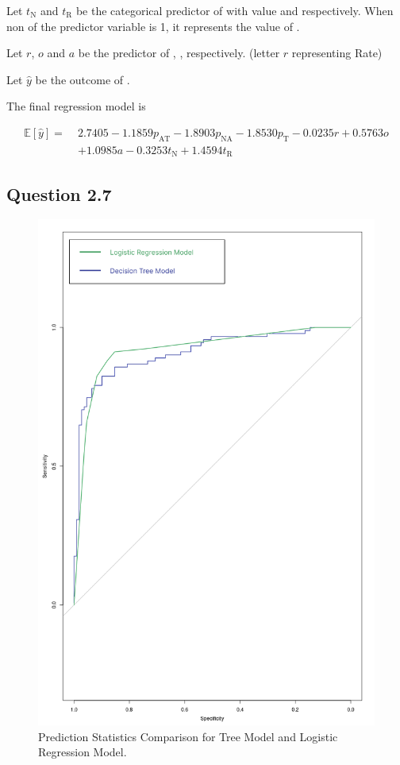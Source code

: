 \documentclass[parskip=full]{scrartcl}
\begin{document}
    Let $t_{\text{N}}$ and $t_{\text{R}}$ be the categorical predictor of  with value  and  respectively. When non of the predictor variable is 1, it represents the value of .

    Let $r$, $o$ and $a$ be the predictor of , ,  respectively. (letter $r$ representing Rate)

    Let $\hat{y}$ be the outcome of .

    The final regression model is

    \[\begin{split}
        \mathbb{E}[\hat{y}] = \; &
          2.7405
        - 1.1859p_{\text{AT}}
        - 1.8903p_{\text{NA}}
        - 1.8530p_{\text{T}}
        - 0.0235r
        + 0.5763o \\ &
        + 1.0985a
        - 0.3253t_\text{N}
        + 1.4594t_\text{R}
    \end{split}\]

    \subsection*{Question 2.7}
    
    \begin{figure}
        \centering
        \includegraphics[width=0.9\linewidth]{diagrams/comp_test.png}
        \caption{Prediction Statistics Comparison for Tree Model and Logistic Regression Model.}
        \label{fig:2_7_fig}
    \end{figure}
\end{document}

